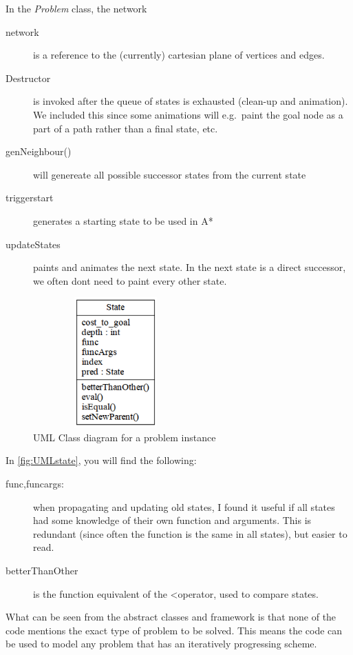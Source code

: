 \documentclass[journal]{IEEEtran}
\begin{document}
In the \textit{Problem} class, the network 
\begin{description}
    \item[network] is a reference to the (currently) cartesian
    plane of vertices and edges. 
    \item[Destructor] is invoked after the queue of states is exhausted (clean-up and animation).
        We included this since some animations will e.g.\ paint the goal node as
        a part of a path rather than a final state, etc.
    \item[genNeighbour()] will genereate all possible successor states
        from the current state
    \item[triggerstart] generates a starting state to be used in A*
    \item[updateStates] paints and animates the next state. In the next state
        is a direct successor, we often dont need to paint every other state.
\end{description}

\begin{figure}[Hb]
\centering
\includegraphics[height=5cm,keepaspectratio,width=2.5in]{fig/problem.png}%
\caption{UML Class diagram for a problem instance}
\label{fig:UMLproblem}
\end{figure}

In \autoref{fig:UMLstate}, you will find the following:
\begin{description}
    \item[func,funcargs:] when propagating and updating old states, I found it
        useful if all states had some knowledge of their own function and arguments.
        This is redundant (since often the function is the same in all states),
        but easier to read.
    \item[betterThanOther] is the function equivalent of the \textless operator,
        used to compare states.
\end{description}

What can be seen from the abstract classes and framework is that none of the code
mentions the exact type of problem to be solved. This means the code can be used
to model any problem that has an iteratively progressing scheme.
\end{document}
